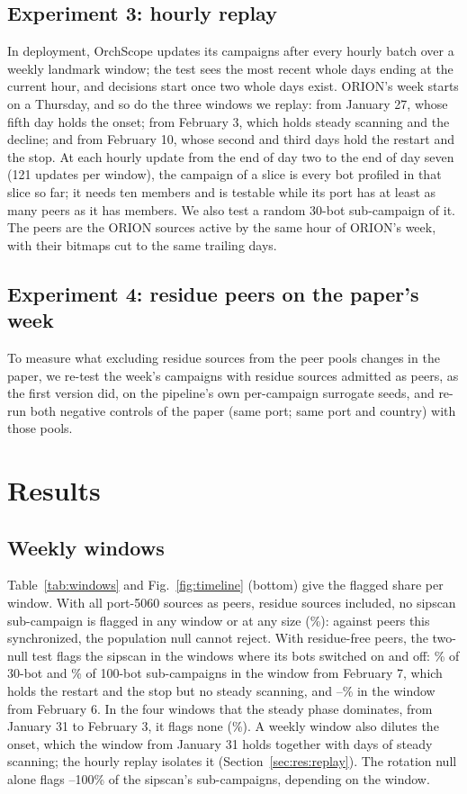 \documentclass[11pt]{article}
\newcommand{\sysname}{OrchScope}
\begin{document}
\subsection{Experiment 3: hourly replay}
\label{sec:replay}
In deployment, \sysname{} updates its campaigns after every hourly batch over a weekly landmark
window; the test sees the most recent whole days ending at the current hour, and decisions start
once two whole days exist. ORION's week starts on a Thursday, and so do the three windows we
replay: from January 27, whose fifth day holds the onset; from February 3, which holds steady
scanning and the decline; and from February 10, whose second and third days hold the restart and
the stop. At each hourly update from the end of day two to the end of day seven (121 updates per
window), the campaign of a slice is every bot profiled in that slice so far; it needs ten members
and is testable while its port has at least as many peers as it has members. We also test a
random 30-bot sub-campaign of it. The peers are the ORION sources active by the same hour of
ORION's week, with their bitmaps cut to the same trailing days.

\subsection{Experiment 4: residue peers on the paper's week}
To measure what excluding residue sources from the peer pools changes in the paper, we re-test
the week's \WeekTested{} campaigns with residue sources admitted as peers, as the first version
did, on the pipeline's own per-campaign surrogate seeds, and re-run both negative controls of the
paper (same port; same port and country) with those pools.

\section{Results}
\label{sec:results}

\subsection{Weekly windows}
Table~\ref{tab:windows} and Fig.~\ref{fig:timeline} (bottom) give the flagged share per window.
With all port-5060 sources as peers, residue sources included, no sipscan sub-campaign is flagged
in any window or at any size (\SipRPMax\%): against peers this synchronized, the population null
cannot reject. With residue-free peers, the two-null test flags the sipscan in the windows where its bots
switched on and off: \SipSevenThirty\% of 30-bot and \SipSevenHundred\% of 100-bot sub-campaigns
in the window from February 7, which holds the restart and the stop but no steady scanning, and
\SipSixThirty--\SipSixThousand\% in the window from February 6. In the four windows that the
steady phase dominates, from January 31 to February 3, it flags none (\SipEarlyMax\%). A weekly
window also dilutes the onset, which the window from January 31 holds together with
\SipSteadyDays{} days of steady scanning; the hourly replay isolates it (Section~\ref{sec:res:replay}).
The rotation null alone flags \SipRotEarlyMin--100\% of the sipscan's sub-campaigns, depending on
the window.
\end{document}
